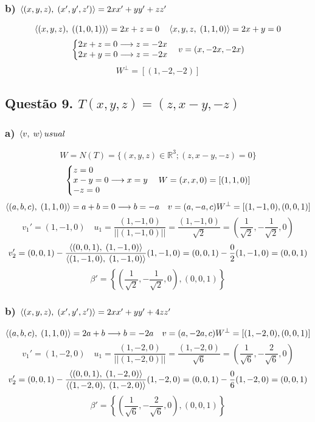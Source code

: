 \documentclass[12pt]{article}
\begin{document}
\subsubsection{b) $\left\langle(x,y,z),\;(x',y',z')\right\rangle = 2xx'+yy'+zz'$}

\[\left\langle(x,y,z),\;((1,0,1))\right\rangle = 2x+z = 0 \quad \left\langle x,y,z,\;(1,1,0)\right\rangle = 2x+y = 0\]
\[\left\{ \begin{array}{@{}l@{}} 2x+z=0 \longrightarrow z=-2x \\ 2x+y=0 \longrightarrow z=-2x \end{array} \right. \quad v = (x,-2x,-2x)\]
\[W^{\perp} = [(1,-2,-2)]\]

\subsection{Questão 9. $T(x,y,z) = (z,x-y,-z)$}
\subsubsection{a) $\left\langle v,\;w\right\rangle usual$}

\[W = N(T) = \lbrace (x,y,z) \in \mathds{R}^{3}; (z,x-y,-z) = 0 \rbrace\]
\[\left\{ \begin{array}{@{}l@{}} z=0 \\ x-y=0 \longrightarrow x=y \\ -z=0 \end{array} \right. \quad W = (x,x,0) = [(1,1,0)]\]
\[\p{(a,b,c)}{(1,1,0)} = a+b = 0 \longrightarrow b=-a \quad v = (a,-a,c) \hfill W^{\perp} = [(1,-1,0),(0,0,1)]\]
\[v_{1}' = (1,-1,0) \quad u_{1} = \dfrac{(1,-1,0)}{||(1,-1,0)||} = \dfrac{(1,-1,0)}{\sqrt{2}} = \left( \dfrac{1}{\sqrt{2}}, -\dfrac{1}{\sqrt{2}}, 0 \right)\]
\[v_{2}' = (0,0,1) - \dfrac{\left\langle(0,0,1),\;(1,-1,0)\right\rangle}{\left\langle(1,-1,0),\;(1,-1,0)\right\rangle}(1,-1,0) = (0,0,1) - \dfrac{0}{2}(1,-1,0) = (0,0,1)\]
\[\beta' = \left\lbrace \left( \dfrac{1}{\sqrt{2}}, -\dfrac{1}{\sqrt{2}}, 0 \right), (0,0,1) \right\rbrace\]

\subsubsection{b) $\left\langle(x,y,z),\;(x',y',z')\right\rangle = 2xx'+yy'+4zz'$}

\[\p{(a,b,c)}{(1,1,0)} = 2a+b \longrightarrow b=-2a \quad v = (a,-2a,c) \hfill W^{\perp} = [(1,-2,0),(0,0,1)]\]
\[v_{1}' = (1,-2,0) \quad u_{1} = \dfrac{(1,-2,0)}{||(1,-2,0)||} = \dfrac{(1,-2,0)}{\sqrt{6}} = \left( \dfrac{1}{\sqrt{6}}, -\dfrac{2}{\sqrt{6}}, 0 \right)\]
\[v_{2}' = (0,0,1) - \dfrac{\left\langle(0,0,1),\;(1,-2,0)\right\rangle}{\left\langle(1,-2,0),\;(1,-2,0)\right\rangle}(1,-2,0) = (0,0,1) - \dfrac{0}{6}(1,-2,0) = (0,0,1)\]
\[\beta' = \left\lbrace \left( \dfrac{1}{\sqrt{6}}, -\dfrac{2}{\sqrt{6}}, 0 \right), (0,0,1) \right\rbrace\]
\end{document}
